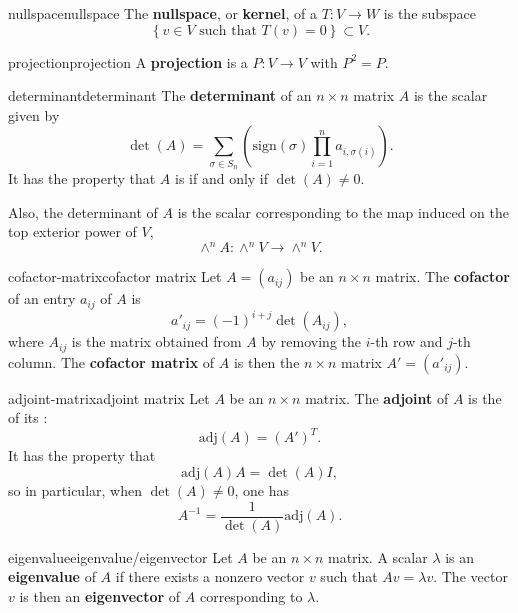 \begin{topic}{nullspace}{nullspace}
    The \textbf{nullspace}, or \textbf{kernel}, of a  $T : V \to W$ is the subspace
    \[ \left\{ v \in V \text{ such that } T(v) = 0 \right\} \subset V . \]
\end{topic}

\begin{topic}{projection}{projection}
    A \textbf{projection} is a  $P : V \to V$ with $P^2 = P$.
\end{topic}

\begin{topic}{determinant}{determinant}
    The \textbf{determinant} of an $n \times n$ matrix $A$ is the scalar given by
    \[ \det(A) = \sum_{\sigma \in S_n} \left( \text{sign}(\sigma) \prod_{i = 1}^{n} a_{i, \sigma(i)} \right) . \]
    It has the property that $A$ is  if and only if $\det(A) \ne 0$.
    
    Also, the determinant of $A$ is the scalar corresponding to the map induced on the top exterior power of $V$,
    \[ \wedge^n A : \wedge^n V \to \wedge^n V . \]
\end{topic}

\begin{topic}{cofactor-matrix}{cofactor matrix}
    Let $A = (a_{ij})$ be an $n \times n$ matrix. The \textbf{cofactor} of an entry $a_{ij}$ of $A$ is
    \[ a'_{ij} = (-1)^{i + j} \det(A_{ij}), \]
    where $A_{ij}$ is the matrix obtained from $A$ by removing the $i$-th row and $j$-th column. The \textbf{cofactor matrix} of $A$ is then the $n \times n$ matrix $A' = (a'_{ij})$.
\end{topic}

\begin{topic}{adjoint-matrix}{adjoint matrix}
    Let $A$ be an $n \times n$ matrix. The \textbf{adjoint} of $A$ is the  of its :
    \[ \text{adj}(A) = (A')^T . \]
    It has the property that
    \[ \text{adj}(A) A = \det(A) I , \]
    so in particular, when $\det(A) \ne 0$, one has
    \[ A^{-1} = \frac{1}{\det(A)} \text{adj}(A) . \]
\end{topic}

\begin{topic}{eigenvalue}{eigenvalue/eigenvector}
    Let $A$ be an $n \times n$ matrix. A scalar $\lambda$ is an \textbf{eigenvalue} of $A$ if there exists a nonzero vector $v$ such that $A v = \lambda v$. The vector $v$ is then an \textbf{eigenvector} of $A$ corresponding to $\lambda$.
\end{topic}

